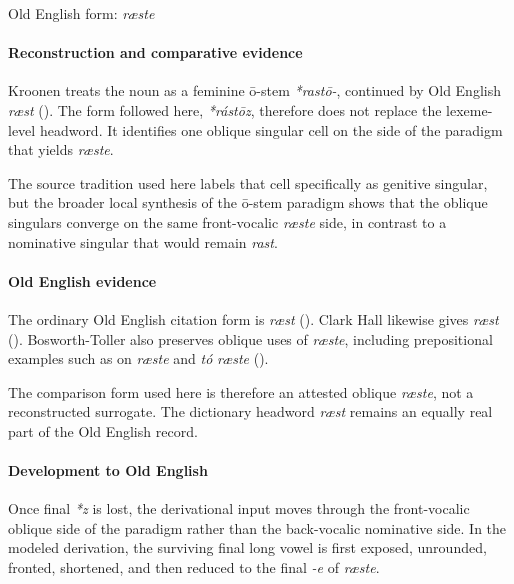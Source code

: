 \documentclass[
  british,
  a4paper,
]{article}
\begin{document}
Old English form: \emph{ræste}

\paragraph{Reconstruction and comparative
evidence}\label{reconstruction-and-comparative-evidence-52}

Kroonen treats the noun as a feminine ō-stem \emph{*rastō-}, continued
by Old English \emph{ræst} (). The form followed here, \emph{*rástōz}, therefore does not
replace the lexeme-level headword. It identifies one oblique singular
cell on the side of the paradigm that yields \emph{ræste}.

The source tradition used here labels that cell specifically as genitive
singular, but the broader local synthesis of the ō-stem paradigm shows
that the oblique singulars converge on the same front-vocalic
\emph{ræste} side, in contrast to a nominative singular that would
remain \emph{rast}.

\paragraph{Old English evidence}\label{old-english-evidence-52}

The ordinary Old English citation form is \emph{ræst}
(). Clark Hall likewise
gives \emph{ræst} ().
Bosworth-Toller also preserves oblique uses of \emph{ræste}, including
prepositional examples such as on \emph{ræste} and \emph{tó}
\emph{ræste} ().

The comparison form used here is therefore an attested oblique
\emph{ræste}, not a reconstructed surrogate. The dictionary headword
\emph{ræst} remains an equally real part of the Old English record.

\paragraph{Development to Old
English}\label{development-to-old-english-52}

Once final \emph{*z} is lost, the derivational input moves through the
front-vocalic oblique side of the paradigm rather than the back-vocalic
nominative side. In the modeled derivation, the surviving final long
vowel is first exposed, unrounded, fronted, shortened, and then reduced
to the final \emph{-e} of \emph{ræste}.
\end{document}
